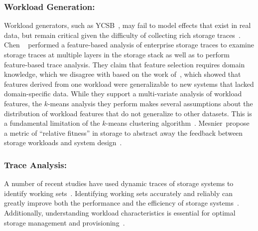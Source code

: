 
\subsubsection*{Workload Generation: }
Workload generators, such as YCSB~\cite{ycsb}, may fail to model effects that
exist in real
data, but remain critical given the difficulty of collecting rich storage traces~\cite{memcached-sigmetrics,ganger1995generating,kurmas2003synthesizing,tarasov2012extracting}.  
Chen \etal~\cite{chen-kmeans} performed a feature-based analysis of enterprise
storage traces to examine storage traces at multiple layers in the storage
stack as well as to perform feature-based trace analysis.  They claim that
feature selection requires domain knowledge, which we disagree with based on
the work of~\cite{powers}, which showed that features derived from one workload
were generalizable to new systems that lacked domain-specific data.
While they support a multi-variate analysis of workload features, the $k$-means
analysis they perform makes several assumptions about the distribution of
workload features that do not generalize to other datasets. %
This is a fundamental limitation of the $k$-means clustering 
algorithm~\cite{robinson}.
Mesnier~\etal propose a metric of ``relative fitness'' in storage to abstract
away the feedback between storage workloads and system
design~\cite{mesnier05,mesnier07}.  



\subsubsection*{Trace Analysis: }

A number of recent studies have used dynamic traces of storage systems to
identify working sets~\cite{doraimani2008file,hands}.  Identifying working sets
accurately and reliably can greatly improve both the performance and the
efficiency of storage systems~\cite{bhadkamkar2009borg}.  Additionally,
understanding workload characteristics is essential for optimal storage
management and provisioning~\cite{ian-tos}.

